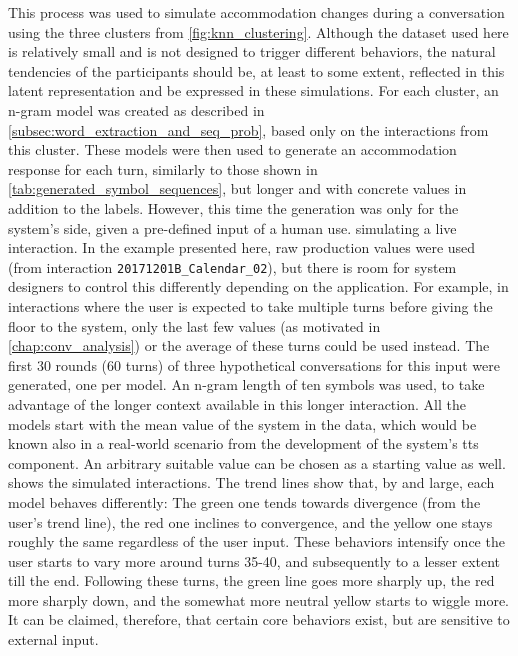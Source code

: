This process was used to simulate accommodation changes during a conversation using the three clusters from \cref{fig:knn_clustering}.
Although the dataset used here is relatively small and is not designed to trigger different behaviors, the natural tendencies of the participants should be, at least to some extent, reflected in this latent representation and be expressed in these simulations.
For each cluster, an n-gram model was created as described in \cref{subsec:word_extraction_and_seq_prob}, based only on the interactions from this cluster.
These models were then used to generate an accommodation response for each turn, similarly to those shown in \cref{tab:generated_symbol_sequences}, but longer and with concrete values in addition to the labels.
However, this time the generation was only for the system's side, given a pre-defined input of a human use. simulating a live interaction.
In the example presented here, raw production values were used (from interaction \texttt{20171201B\_Calendar\_02}), but there is room for system designers to control this differently depending on the application.
For example, in interactions where the user is expected to take multiple turns before giving the floor to the system, only the last few values (as motivated in \cref{chap:conv_analysis}) or the average of these turns could be used instead.
The first 30 rounds (60 turns) of three hypothetical conversations for this input were generated, one per model.
An n-gram length of ten symbols was used, to take advantage of the longer context available in this longer interaction.
All the models start with the mean value of the system in the data, which would be known also in a real-world scenario from the development of the system's \ac{tts} component.
An arbitrary suitable value can be chosen as a starting value as well.
 shows the simulated interactions.
The trend lines show that, by and large, each model behaves differently:
The green one tends towards divergence (from the user's trend line), the red one inclines to convergence, and the yellow one stays roughly the same regardless of the user input.
These behaviors intensify once the user starts to vary more around turns 35-40, and subsequently to a lesser extent till the end.
Following these turns, the green line goes more sharply up, the red more sharply down, and the somewhat more neutral yellow starts to wiggle more.
It can be claimed, therefore, that certain core behaviors exist, but are sensitive to external input.
